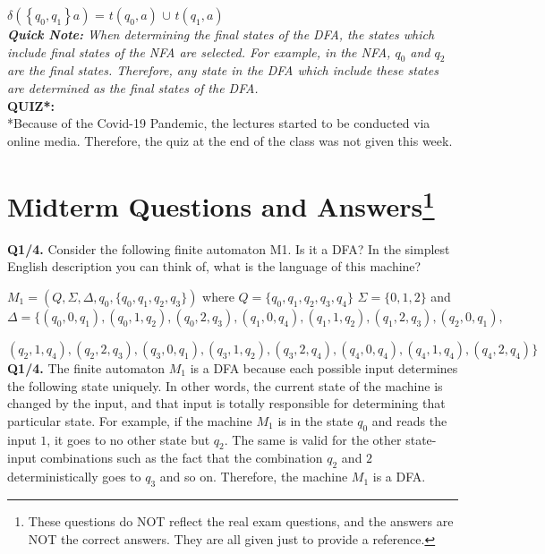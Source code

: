 \documentclass[12pt,a4paper]{article}
\begin{document}
{$\delta(\left\lbrace q_0, q_1\right\rbrace a)$ = $t(q_0,a)$ $\cup$ $t(q_1,a)$\\

\indent \textit{\textbf{Quick Note:} When determining the final states of the DFA, the states which include final states of the NFA are selected. For example, in the NFA, $q_0$ and $q_2$ are the final states. Therefore, any state in the DFA which include these states are determined as the final states of the DFA.}\\

\noindent \textbf{\Large{QUIZ*:}}\\

*Because of the Covid-19 Pandemic, the lectures started to be conducted via online media. Therefore, the quiz at the end of the class was not given this week.

\section[Midterm Questions and Answers]{Midterm Questions and Answers\footnote{These questions do NOT reflect the real exam questions, and the answers are NOT the correct answers. They are all given just to provide a reference.}}

\textbf{Q1/4.} Consider the following ﬁnite automaton M1. Is it a DFA? In the simplest English description you can think of, what is the language of this machine?

$M_1 = (Q,\Sigma,\Delta,q_0,\lbrace q_0,q_1,q_2,q_3\rbrace)$ where $Q =\lbrace q_0,q_1,q_2,q_3,q_4\rbrace$ $\Sigma=\lbrace 0,1,2\rbrace $ and \\

$\Delta =\lbrace(q_0,0,q_1),(q_0,1,q_2),(q_0,2,q_3),(q_1,0,q_4),(q_1,1,q_2),(q_1,2,q_3),(q_2,0,q_1),$


$(q_2,1,q_4),(q_2,2,q_3),(q_3,0,q_1),(q_3,1,q_2),(q_3,2,q_4),(q_4,0,q_4),(q_4,1,q_4),(q_4,2,q_4)\rbrace$\\

\noindent \textbf{Q1/4.} The finite automaton $M_1$ is a DFA because each possible input determines the following state uniquely. In other words, the current state of the machine is changed by the input, and that input is totally responsible for determining that particular state. For example, if the machine $M_1$ is in the state $q_0$ and reads the input $1$, it goes to no other state but $q_2$. The same is valid for the other state-input combinations such as the fact that the combination $q_2$ and $2$ deterministically goes to $q_3$ and so on. Therefore, the machine $M_1$ is a DFA.\\
 
}
\end{document}
